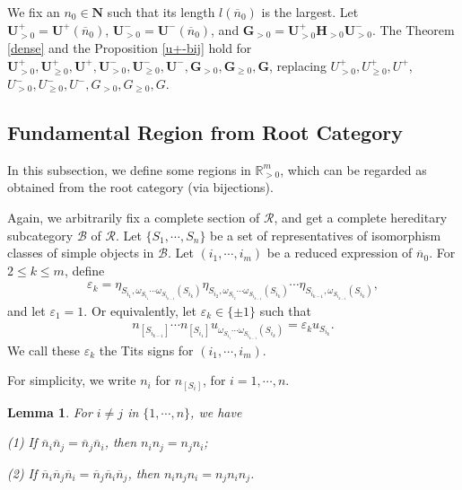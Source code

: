 \documentclass[12pt]{amsart}
\newtheorem{lemma}[theorem]{Lemma}
\begin{document}
We fix an $n_0\in \mathbf{N}$ such that its length $l(\overline{n}_0)$ is the largest.
Let $\mathbf{U}^+_{>0}=\mathbf{U}^+(\overline{n}_0)$, $\mathbf{U}^-_{>0}=\mathbf{U}^-(\overline{n}_0)$, and $\mathbf{G}_{>0}=\mathbf{U}^+_{>0} \mathbf{H}_{>0}\mathbf{U}^-_{>0}$.
The Theorem \ref{dense} and the Proposition \ref{u+-bij} hold for $\mathbf{U}^+_{>0},\mathbf{U}^+_{\geq 0},\mathbf{U}^+,\mathbf{U}^-_{>0},\mathbf{U}^-_{\geq 0},\mathbf{U}^-,\mathbf{G}_{>0},\mathbf{G}_{\geq 0},\mathbf{G}$, replacing $U^+_{>0},U^+_{\geq 0},U^+$, $U^-_{>0},U^-_{\geq 0},U^-,G_{>0},G_{\geq 0},G$.



\subsection{Fundamental Region from Root Category}

In this subsection, we define some regions in $\mathbb{R}_{>0}^m$, which can be regarded as obtained from the root category (via bijections).

Again, we arbitrarily fix a complete section of $\mathcal{R}$, and get a complete hereditary subcategory $\mathcal{B}$ of $\mathcal{R}$.
Let $\{S_1,\cdots,S_n\}$ be a set of representatives of isomorphism classes of simple objects in $\mathcal{B}$.
Let $(i_1,\cdots,i_m)$ be a reduced expression of $\overline{n}_0$. 
For $2\leq k \leq m$, define 
\begin{align*}
    \varepsilon_k = \eta_{S_{i_1},\omega_{S_{i_1}}\cdots \omega_{S_{i_{k-1}}}(S_{i_k})} \eta_{S_{i_{2}},\omega_{S_{i_{2}}}\cdots \omega_{S_{i_{k-1}}}(S_{i_k})} \cdots \eta_{S_{i_{k-1}},\omega_{S_{i_{k-1}}}(S_{i_k})},
\end{align*}
and let $\varepsilon_1=1$.
Or equivalently, let $\varepsilon_k\in \{\pm 1\}$ such that 
\begin{align*}
    n_{[S_{i_{k-1}}]}\cdots n_{[S_{i_1}]} u_{\omega_{S_{i_1}}\cdots \omega_{S_{i_{k-1}}}(S_{i_k})} = \varepsilon_k u_{S_{i_k}}.
\end{align*}
We call these $\varepsilon_k$ the Tits signs for $(i_1,\cdots,i_m)$.

For simplicity, we write $n_i$ for $n_{[S_i]}$, for $i=1,\cdots,n$.

\begin{lemma}
    For $i\neq j$ in $\{1,\cdots,n\}$, we have 

    (1) If $\overline{n}_i\overline{n}_j=\overline{n}_j\overline{n}_i$, then $n_in_j=n_jn_i$;

    (2) If $\overline{n}_i\overline{n}_j\overline{n}_i=\overline{n}_j\overline{n}_i\overline{n}_j$, then $n_in_jn_i=n_jn_in_j$.
\end{lemma}
\end{document}
